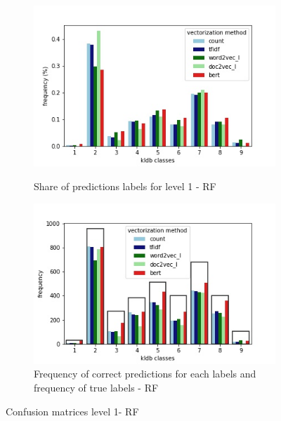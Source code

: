 \documentclass[12pt, a4paper, titlepage]{article}
\begin{document}
\begin{figure}
  \centering
  \begin{subfigure}[b]{0.475\textwidth}
      \centering
      \includegraphics[width=\textwidth]{predictions_RF.jpg}
      {
        {


          \small Share of predictions labels for level 1 - RF}
      }    
  \end{subfigure}
  \hfill
  \begin{subfigure}[b]{0.475\textwidth}  
      \centering 
      \includegraphics[width=\textwidth]{predictions_correct_relative_RF.jpg}
      {{\small Frequency of correct predictions for each labels and frequency of true labels - \ac{RF}}}    
  \end{subfigure}
\caption{\label{fig: F18} Confusion matrices level 1- RF}
\end{figure}
\end{document}
